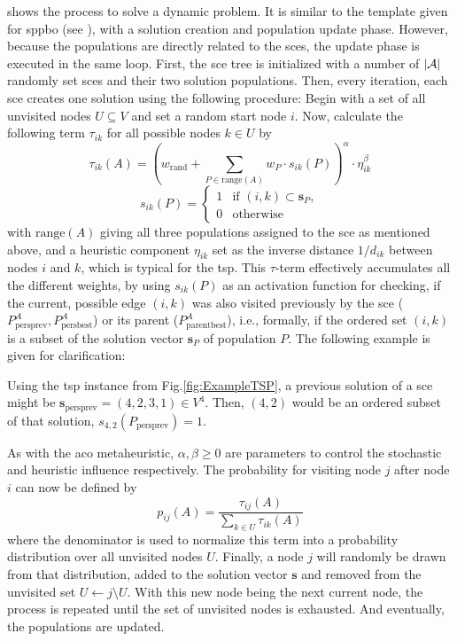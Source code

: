  shows the process to solve a dynamic problem. It is similar to the template given for \gls{sppbo} (see ), with a solution creation and population update phase. However, because the populations are directly related to the \glspl{sce}, the update phase is executed in the same loop.
First, the \gls{sce} tree is initialized with a number of $\left\lvert\mathcal{A}\right\rvert$ randomly set \glspl{sce} and their two solution populations.
Then, every iteration, each \gls{sce} creates one solution using the following procedure: Begin with a set of all unvisited nodes $U \subseteq V$ and set a random start node $i$. Now, calculate the following term $\tau_{ik}$ for all possible nodes $k \in U$ by
\begin{equation}
	\label{eq:hsppbo_tau}
	\tau_{ik}(A) = \left(  w_{\text{rand}} + \sum_{P\in \text{range}(A)} w_P \cdot s_{ik}(P)  \right)^\alpha \cdot \eta^\beta_{ik}
\end{equation}
\begin{equation*}
	s_{ik}(P) = \begin{cases}
		1 & \text{if $(i,k) \subset \mathbf{s}_P$},\\
		0 & \text{otherwise}
	\end{cases}
\end{equation*}
with $\text{range}(A)$ giving all three populations assigned to the \gls{sce} as mentioned above, and a heuristic component $\eta_{ik}$ set as the inverse distance $1 / d_{ik}$ between nodes $i$ and $k$, which is typical for the \gls{tsp}. This $\tau$-term effectively accumulates all the different weights, by using $s_{ik}(P)$ as an activation function for checking, if the current, possible edge $(i,k)$ was also visited previously by the \gls{sce} ($P^{A}_{\text{persprev}}, P^{A}_{\text{persbest}}$) or its parent ($P^{A}_{\text{parentbest}}$), i.e., formally, if the ordered set $(i,k)$ is a subset of the solution vector $\mathbf{s}_P$ of population $P$. The following example is given for clarification:
\begin{example}
Using the \gls{tsp} instance from Fig.\ref{fig:ExampleTSP}, a previous solution of a \gls{sce} might be $\mathbf{s}_\text{persprev} = (4,2,3,1) \in V^4$. Then, $(4,2)$ would be an ordered subset of that solution, $s_{4,2}(P_\text{persprev}) = 1$.
\end{example}
As with the \gls{aco} metaheuristic, $\alpha, \beta \geq 0$ are parameters to control the stochastic and heuristic influence respectively. 
The probability for visiting node $j$ after node $i$ can now be defined by
\begin{equation}
	\label{eq:hsppbo_prob}
	p_{ij}(A) = \frac{\tau_{ij}(A)}{\sum_{k \in U} \tau_{ik}(A)}
\end{equation}
where the denominator is used to normalize this term into a probability distribution over all unvisited nodes $U$. Finally, a node $j$ will randomly be drawn from that distribution, added to the solution vector $\mathbf{s}$ and removed from the unvisited set $U \gets {j}\setminus U$. With this new node being the next current node, the process is repeated until the set of unvisited nodes is exhausted. And eventually, the populations are updated.

